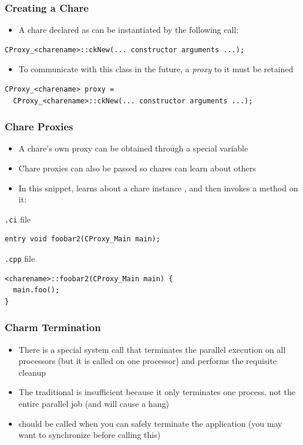 \begin{frame}[fragile]
  \frametitle{Creating a Chare}
  \begin{itemize}
    \item A chare declared as  can be
      instantiated by the following call:
  \end{itemize}
\begin{lstlisting}
CProxy_<charename>::ckNew(... constructor arguments ...);
\end{lstlisting}
  \begin{itemize}
  \item To communicate with this class in the future, a \textit{proxy} to it
    must be retained
  \end{itemize}
\begin{lstlisting}
CProxy_<charename> proxy = 
  CProxy_<charename>::ckNew(... constructor arguments ...);
\end{lstlisting}
\end{frame}

\begin{frame}[fragile]
  \frametitle{Chare Proxies}
  \begin{itemize}
  \item A chare's own proxy can be obtained through a special variable
  \item Chare proxies can also be passed so chares can learn about others
  \item In this snippet,  learns about a chare instance
    , and then invokes a method on it:
  \end{itemize}
\texttt{.ci} file
\begin{lstlisting}
entry void foobar2(CProxy_Main main);
\end{lstlisting}
\texttt{.cpp} file
\begin{lstlisting}
<charename>::foobar2(CProxy_Main main) {
  main.foo();
}
\end{lstlisting}
\end{frame}

\begin{frame}[fragile]
   \frametitle{Charm Termination}
   \begin{itemize}
   \item There is a special system call  that terminates the
     parallel execution on all processors (but it is called on one processor)
     and performs the requisite cleanup
   \item The traditional  is insufficient because it only
     terminates one process, not the entire parallel job (and will cause a
     hang)
   \item {} should be called when you can safely terminate the
     application (you may want to synchronize before calling this)
   \end{itemize}
\end{frame}

